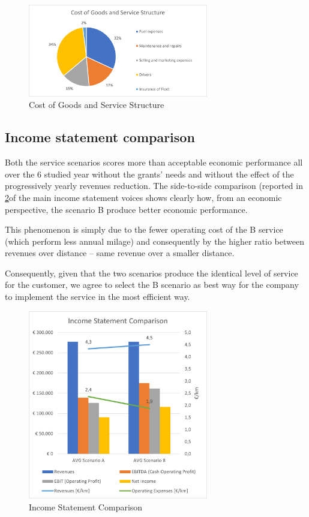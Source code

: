 \begin{figure}[h]
    \centering
    \includegraphics[width=0.7\textwidth]{Images/financial/Cost_of_Goods.png}
    \caption{Cost of Goods and Service Structure}
    \label{fig:costgoodsservice}
\end{figure}

\subsection{Income statement comparison}
Both the service scenarios scores more than acceptable economic performance all over the 6 studied year without the grants’ needs and without the effect of the progressively yearly revenues reduction.
The side-to-side comparison (reported in \ref{fig:income_statement_comparison}of the main income statement voices shows clearly how, from an economic perspective, the scenario B produce better economic performance. 

This phenomenon is simply due to the fewer operating cost of the B service (which perform less annual milage) and consequently by the higher ratio between revenues over distance – same revenue over a smaller distance. 

Consequently, given that the two scenarios produce the identical level of service for the customer, we agree to select the B scenario as best way for the company to implement the service in the most efficient way.

\begin{figure}[h]
    \centering
    \includegraphics[width=0.7\textwidth]{Images/financial/Comparison.png}
    \caption{Income Statement Comparison}
    \label{fig:income_statement_comparison}
\end{figure}

